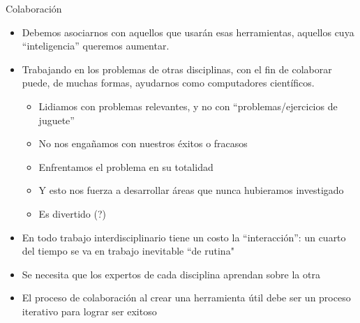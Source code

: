 \documentclass{beamer}
\begin{document}
\begin{frame}{Colaboración}
\begin{itemize}
\item Debemos asociarnos con aquellos que usarán esas herramientas, aquellos cuya ``inteligencia'' queremos aumentar.
\item Trabajando en los problemas de otras disciplinas, con el fin de colaborar puede, de muchas formas, ayudarnos como computadores científicos.
	\begin{itemize}
	\item Lidiamos con problemas relevantes, y no con ``problemas/ejercicios de juguete''
	\item No nos engañamos con nuestros éxitos o fracasos
	\item Enfrentamos el problema en su totalidad
	\item Y esto nos fuerza a desarrollar áreas que nunca hubieramos investigado
	\item Es divertido (?)
	\end{itemize}
\item En todo trabajo interdisciplinario tiene un costo la ``interacción'': un cuarto del tiempo se va en trabajo inevitable ``de rutina"
\item Se necesita que los expertos de cada disciplina aprendan sobre la otra
\item El proceso de colaboración al crear una herramienta útil debe ser un proceso iterativo para lograr ser exitoso

\end{itemize}
\end{frame}
\end{document}

